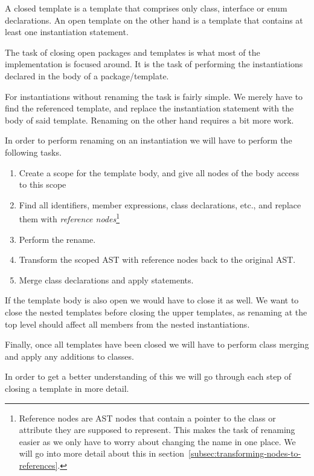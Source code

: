 A closed template is a template that comprises only class, interface or enum declarations.
An open template on the other hand is a template that contains at least one instantiation statement.

The task of closing open packages and templates is what most of the implementation is focused around.
It is the task of performing the instantiations declared in the body of a package/template.

For instantiations without renaming the task is fairly simple.
We merely have to find the referenced template, and replace the instantiation statement with the body of said template.
Renaming on the other hand requires a bit more work.

In order to perform renaming on an instantiation we will have to perform the following tasks.
\begin{enumerate}
    \item Create a scope for the template body, and give all nodes of the body access to this scope
    \item Find all identifiers, member expressions, class declarations, etc., and replace them with \textit{reference nodes}\footnote{Reference nodes are AST nodes that contain a pointer to the class or attribute they are supposed to represent. This makes the task of renaming easier as we only have to worry about changing the name in one place. We will go into more detail about this in section~\vref{subsec:transforming-nodes-to-references}.}
    \item Perform the rename.
    \item Transform the scoped AST with reference nodes back to the original AST\@.
    \item Merge class declarations and apply  statements.
\end{enumerate}

If the template body is also open we would have to close it as well.
We want to close the nested templates before closing the upper templates, as renaming at the top level should affect all members from the nested instantiations.

Finally, once all templates have been closed we will have to perform class merging and apply any additions to classes.

In order to get a better understanding of this we will go through each step of closing a template in more detail.


